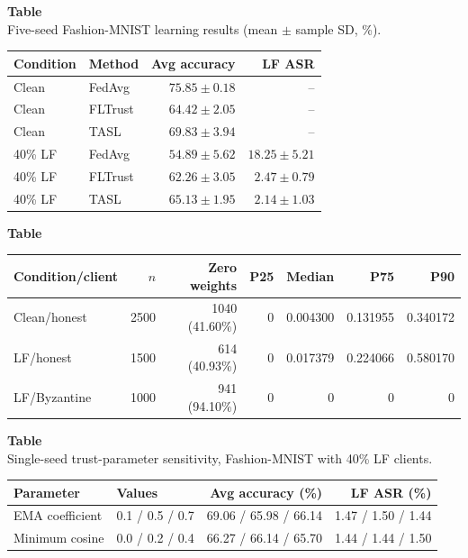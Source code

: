 \noindent\begin{minipage}{\textwidth}
\label{tab:principal_five_seed}
\textbf{Table~\thetable}\\
\centering
\color{red}
Five-seed Fashion-MNIST learning results (mean $\pm$ sample SD, \%).
\par\smallskip
\small
\setlength{\tabcolsep}{8pt}
\begin{tabular}{llrr}
\toprule
Condition & Method & Avg accuracy & LF ASR \\
\midrule
Clean & FedAvg & $75.85\pm0.18$ & -- \\
Clean & FLTrust & $64.42\pm2.05$ & -- \\
Clean & TASL & $69.83\pm3.94$ & -- \\
\midrule
40\% LF & FedAvg & $54.89\pm5.62$ & $18.25\pm5.21$ \\
40\% LF & FLTrust & $62.26\pm3.05$ & $2.47\pm0.79$ \\
40\% LF & TASL & $65.13\pm1.95$ & $2.14\pm1.03$ \\
\bottomrule
\end{tabular}
\end{minipage}

\noindent\begin{minipage}{\textwidth}
\label{tab:client_weight_distribution}
\textbf{Table~\thetable}\\
\par\smallskip\centering\small
\setlength{\tabcolsep}{4pt}
\begin{tabular}{lrrrrrr}
\toprule
Condition/client & $n$ & Zero weights & P25 & Median & P75 & P90 \\
\midrule
Clean/honest & 2500 & 1040 (41.60\%) & 0 & 0.004300 & 0.131955 & 0.340172 \\
LF/honest & 1500 & 614 (40.93\%) & 0 & 0.017379 & 0.224066 & 0.580170 \\
LF/Byzantine & 1000 & 941 (94.10\%) & 0 & 0 & 0 & 0 \\
\bottomrule
\end{tabular}
\end{minipage}

\noindent\begin{minipage}{\textwidth}
\label{tab:appendix_trust_sensitivity}
\textbf{Table~\thetable}\\
Single-seed trust-parameter sensitivity, Fashion-MNIST with 40\% LF clients.
\par\smallskip
\centering\small
\setlength{\tabcolsep}{12pt}
\begin{tabular}{llrr}
\toprule
Parameter & Values & Avg accuracy (\%) & LF ASR (\%) \\
\midrule
EMA coefficient & 0.1 / 0.5 / 0.7 & 69.06 / 65.98 / 66.14 & 1.47 / 1.50 / 1.44 \\
Minimum cosine & 0.0 / 0.2 / 0.4 & 66.27 / 66.14 / 65.70 & 1.44 / 1.44 / 1.50 \\
\bottomrule
\end{tabular}
\end{minipage}

